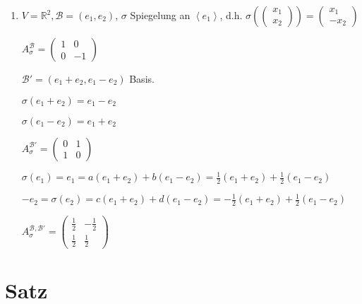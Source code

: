 \documentclass[a4paper, openany]{book}
\begin{document}
\begin{enumerate}[label=(\alph*)]
          \item $V = \mathbb{R}^2, \mathcal{B} = (e_1, e_2)$, $\sigma$ Spiegelung an $\left \langle e_1 \right \rangle$, d.h. $\sigma(\begin{pmatrix}x_1 \\ x_2 \end{pmatrix}) = \begin{pmatrix}x_1 \\ - x_2 \end{pmatrix}$

          $A_{\sigma}^{\mathcal{B}} = \begin{pmatrix}1 & 0 \\ 0 & -1 \end{pmatrix}$

          \par \medskip

          \par \medskip

          $\mathcal{B'} = (e_1 + e_2, e_1 - e_2)$ Basis.

          $\sigma(e_1 + e_2) = e_1-e_2$

          $\sigma(e_1 - e_2) = e_1 + e_2$

          $A_{\sigma}^{\mathcal{B'}} = \begin{pmatrix}0 & 1 \\ 1 & 0 \end{pmatrix}$

          \par \medskip

          \par \medskip


          $\sigma(e_1) = e_1 = a(e_1 + e_2) + b(e_1 - e_2) = \frac{1}{2} (e_1 + e_2) + \frac{1}{2}(e_1 - e_2)$

          $- e_2 = \sigma(e_2) = c (e_1 + e_2) + d (e_1 - e_2) = - \frac{1}{2}(e_1 + e_2) + \frac{1}{2} (e_1 - e_2)$

          $A_{\sigma}^{\mathcal{B, B'}} = \begin{pmatrix}\frac{1}{2} & - \frac{1}{2} \\ \frac{1}{2} & \frac{1}{2} \end{pmatrix}$
        \end{enumerate}

        \section{Satz}
\end{document}
